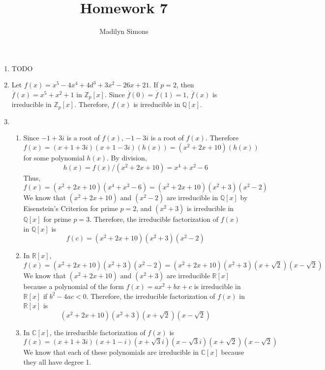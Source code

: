 \documentclass{article}
\title{Homework 7}
\author{Madilyn Simons}
\date{}
\begin{document}
\maketitle

\begin{enumerate}

\item TODO

\item Let $f(x) = x^5 - 4x^4 + 4d^3 + 3x^2 -26x + 21$.
If $p = 2$, then $\overline{f}(x) = x^5 + x^2 + 1$ in $\mathbb{Z}_{p}[x]$.
Since $\overline{f}(0) = \overline{f}(1) = 1$, $\overline{f}(x)$ is
irreducible in $\mathbb{Z}_{p}[x]$.  Therefore, $f(x)$ is
irreducible in $\mathbb{Q}[x]$.

\item
\begin{enumerate}
\item
Since $-1 + 3i$ is a root of $f(x)$, $-1 - 3i$ is a root of $f(x)$.
Therefore
\[
f(x) = (x + 1 + 3i)(x + 1 - 3i)(h(x)) = (x^2 + 2x + 10)(h(x))
\] for
some polynomial $h(x)$.
By division,
\[h(x) = f(x) / (x^2 + 2x + 10) = x^4 + x^2 - 6
\]
Thus,
\[f(x) = (x^2 + 2x + 10)(x^4 + x^2 - 6) = (x^2 + 2x + 10)(x^2 + 3)(x^2 - 2)
\]
We know that $(x^2 + 2x + 10)$ and $(x^2 - 2)$ are irreducible in $\mathbb{Q}[x]$
by Eisenstein's Criterion for prime $p = 2$, and $(x^2 + 3)$ is irreducible
in $\mathbb{Q}[x]$ for prime $p = 3$.  Therefore, the irreducible
factorization of $f(x)$ in $\mathbb{Q}[x]$ is
\[
f(c) = (x^2 + 2x + 10)(x^2 + 3)(x^2 - 2)
\]

\item
In $\mathbb{R}[x]$,
\[f(x) = (x^2 + 2x + 10)(x^2 + 3)(x^2 - 2)
= (x^2 + 2x + 10)(x^2 + 3)(x + \sqrt{2})(x - \sqrt{2})
\]
We know that $(x^2 + 2x + 10)$ and $(x^2 + 3)$ are irreducible $\mathbb{R}[x]$
because a polynomial of the form $f(x) = ax^2 + bx + c$ is irreducible in
$\mathbb{R}[x]$ if $b^2 - 4ac < 0$.  Therefore, the irreducible factorization
of $f(x)$ in $\mathbb{R}[x]$ is
\[
(x^2 + 2x + 10)(x^2 + 3)(x + \sqrt{2})(x - \sqrt{2})
\]

\item
In $\mathbb{C}[x]$, the irreducible factorization of $f(x)$ is
\[
f(x) = (x + 1 + 3i)(x + 1 - i)(x + \sqrt{3}i)(x - \sqrt{3}i)(x + \sqrt{2})(x - \sqrt{2})
\]
We know that each of these polynomials are irreducible in $\mathbb{C}[x]$ because
they all have degree 1.

\end{enumerate}
\end{enumerate}
\end{document}
